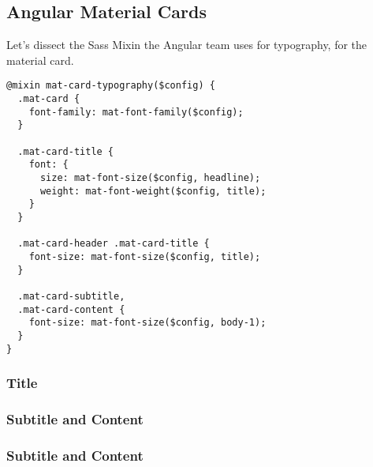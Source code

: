 \subsection{Angular Material Cards}
Let's dissect the Sass Mixin the Angular team uses for typography,
for the material card. 
\begin{lstlisting}[caption=@angular/material/\_theming.scss]
@mixin mat-card-typography($config) {
  .mat-card {
    font-family: mat-font-family($config);
  }

  .mat-card-title {
    font: {
      size: mat-font-size($config, headline);
      weight: mat-font-weight($config, title);
    }
  }

  .mat-card-header .mat-card-title {
    font-size: mat-font-size($config, title);
  }

  .mat-card-subtitle,
  .mat-card-content {
    font-size: mat-font-size($config, body-1);
  }
}
\end{lstlisting}

\subsubsection{Title}
\subsubsection{Subtitle and Content}
\subsubsection{Subtitle and Content}